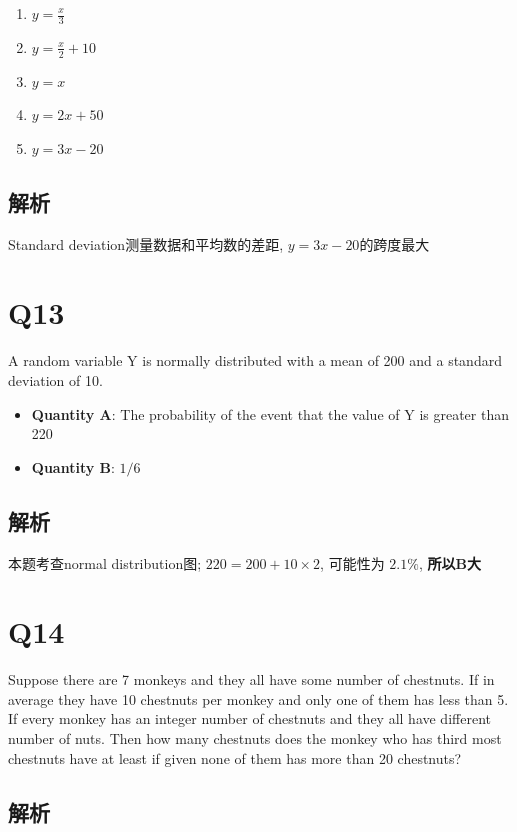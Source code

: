   \begin{enumerate}
    \item $ y = \frac{x}{3} $
    \item $ y = \frac{x}{2} + 10 $
    \item $ y = x $
    \item $ y = 2x + 50 $
    \item $ y = 3x - 20 $
  \end{enumerate}

  \subsection{解析}

    Standard deviation测量数据和平均数的差距, $ y = 3x - 20 $的跨度最大

\section{Q13}

  A random variable Y is normally distributed with a mean of 200 and a standard
  deviation of 10.

  \begin{itemize}
    \item \textbf{Quantity A}: The probability of the event that the value of Y
    is greater than 220
    \item \textbf{Quantity B}: $ 1/6 $
  \end{itemize}

  \subsection{解析}

    本题考查normal distribution图; $ 220 = 200 + 10 \times 2 $, 可能性为 $ 2.1\% $,
    \textbf{所以B大}

\section{Q14}

  Suppose there are 7 monkeys and they all have some number of chestnuts.
  If in average they have 10 chestnuts per monkey and only one of them has
  less than 5. If every monkey has an integer number of chestnuts and they all
  have different number of nuts. Then how many chestnuts does the monkey who
  has third most chestnuts have at least if given none of them has more than
  20 chestnuts?

  \subsection{解析}


